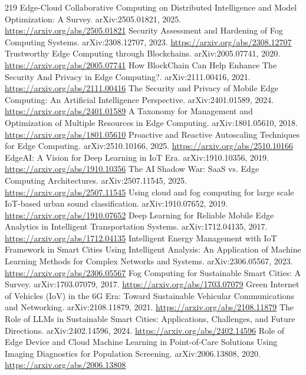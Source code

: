 \documentclass[11pt]{article}
\begin{document}
\begin{thebibliography}{219}
 Edge-Cloud Collaborative Computing on Distributed Intelligence and Model Optimization: A Survey. arXiv:2505.01821, 2025. \url{https://arxiv.org/abs/2505.01821}
 Security Assessment and Hardening of Fog Computing Systems. arXiv:2308.12707, 2023. \url{https://arxiv.org/abs/2308.12707}
 Trustworthy Edge Computing through Blockchains. arXiv:2005.07741, 2020. \url{https://arxiv.org/abs/2005.07741}
 How BlockChain Can Help Enhance The Security And Privacy in Edge Computing?. arXiv:2111.00416, 2021. \url{https://arxiv.org/abs/2111.00416}
 The Security and Privacy of Mobile Edge Computing: An Artificial Intelligence Perspective. arXiv:2401.01589, 2024. \url{https://arxiv.org/abs/2401.01589}
 A Taxonomy for Management and Optimization of Multiple Resources in Edge Computing. arXiv:1801.05610, 2018. \url{https://arxiv.org/abs/1801.05610}
 Proactive and Reactive Autoscaling Techniques for Edge Computing. arXiv:2510.10166, 2025. \url{https://arxiv.org/abs/2510.10166}
 EdgeAI: A Vision for Deep Learning in IoT Era. arXiv:1910.10356, 2019. \url{https://arxiv.org/abs/1910.10356}
 The AI Shadow War: SaaS vs. Edge Computing Architectures. arXiv:2507.11545, 2025. \url{https://arxiv.org/abs/2507.11545}
 Using cloud and fog computing for large scale IoT-based urban sound classification. arXiv:1910.07652, 2019. \url{https://arxiv.org/abs/1910.07652}
 Deep Learning for Reliable Mobile Edge Analytics in Intelligent Transportation Systems. arXiv:1712.04135, 2017. \url{https://arxiv.org/abs/1712.04135}
 Intelligent Energy Management with IoT Framework in Smart Cities Using Intelligent Analysis: An Application of Machine Learning Methods for Complex Networks and Systems. arXiv:2306.05567, 2023. \url{https://arxiv.org/abs/2306.05567}
 Fog Computing for Sustainable Smart Cities: A Survey. arXiv:1703.07079, 2017. \url{https://arxiv.org/abs/1703.07079}
 Green Internet of Vehicles (IoV) in the 6G Era: Toward Sustainable Vehicular Communications and Networking. arXiv:2108.11879, 2021. \url{https://arxiv.org/abs/2108.11879}
 The Role of LLMs in Sustainable Smart Cities: Applications, Challenges, and Future Directions. arXiv:2402.14596, 2024. \url{https://arxiv.org/abs/2402.14596}
 Role of Edge Device and Cloud Machine Learning in Point-of-Care Solutions Using Imaging Diagnostics for Population Screening. arXiv:2006.13808, 2020. \url{https://arxiv.org/abs/2006.13808}

\end{thebibliography}
\end{document}
